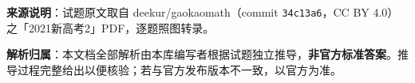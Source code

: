

\begin{gknotice}
\textbf{来源说明}：试题原文取自 deekur/gaokaomath（commit \texttt{34c13a6}，CC BY 4.0）之「2021新高考2」PDF，逐题照图转录。

\textbf{解析归属}：本文档全部解析由本库编写者根据试题独立推导，\textbf{非官方标准答案}。推导过程完整给出以便核验；若与官方发布版本不一致，以官方为准。
\end{gknotice}

\par\medskip


